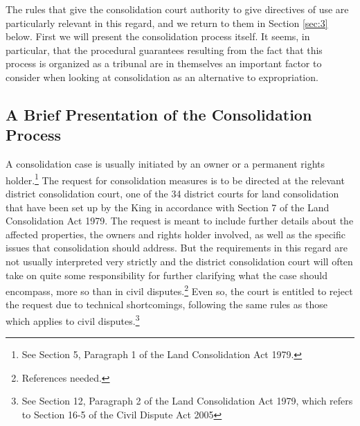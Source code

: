 The rules that give the consolidation court authority to give directives of use are particularly relevant in this regard, and we return to them in Section \ref{sec:3} below. First we will present the consolidation process itself. It seems, in particular, that the procedural guarantees resulting from the fact that this process is organized as a tribunal are in themselves an important factor to consider when looking at consolidation as an alternative to expropriation.

\subsection{A Brief Presentation of the Consolidation Process}\label{subsec:21}

A consolidation case is usually initiated by an owner or a permanent rights holder.\footnote{See Section 5, Paragraph 1 of the Land Consolidation Act 1979.} The request for consolidation measures is to be directed at the relevant district consolidation court, one of the 34 district courts for land consolidation that have been set up by the King in accordance with Section 7 of the Land Consolidation Act 1979. The request is meant to include further details about the affected properties, the owners and rights holder involved, as well as the specific issues that consolidation should address. But the requirements in this regard are not usually interpreted very strictly and the district consolidation court will often take on quite some responsibility for further clarifying what the case should encompass, more so than in civil disputes.\footnote{References needed.} Even so, the court is entitled to reject the request due to technical shortcomings, following the same rules as those which applies to civil disputes.\footnote{See Section 12, Paragraph 2 of the Land Consolidation Act 1979, which refers to Section 16-5 of the Civil Dispute Act 2005}


